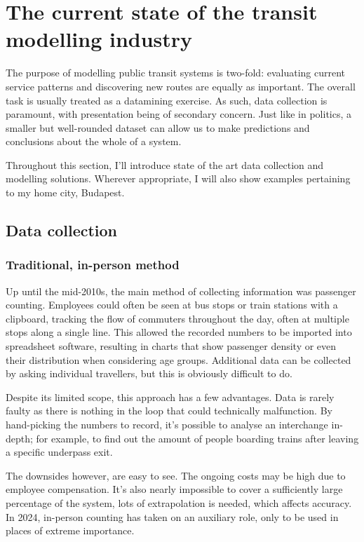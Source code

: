 \chapter{The current state of the transit modelling industry}
The purpose of modelling public transit systems is two-fold: evaluating current service patterns and discovering new routes are equally as important. The overall task is usually treated as a datamining exercise. As such, data collection is paramount, with presentation being of secondary concern. Just like in politics, a smaller but well-rounded dataset can allow us to make predictions and conclusions about the whole of a system.

Throughout this section, I'll introduce state of the art data collection and modelling solutions. Wherever appropriate, I will also show examples pertaining to my home city, Budapest.

\section{Data collection}
\subsection{Traditional, in-person method}

Up until the mid-2010s, the main method of collecting information was passenger counting. Employees could often be seen at bus stops or train stations with a clipboard, tracking the flow of commuters throughout the day, often at multiple stops along a single line. This allowed the recorded numbers to be imported into spreadsheet software, resulting in charts that show passenger density or even their distribution when considering age groups.
Additional data can be collected by asking individual travellers, but this is obviously difficult to do.

Despite its limited scope, this approach has a few advantages. Data is rarely faulty as there is nothing in the loop that could technically malfunction. By hand-picking the numbers to record, it's possible to analyse an interchange in-depth; for example, to find out the amount of people boarding trains after leaving a specific underpass exit.

The downsides however, are easy to see. The ongoing costs may be high due to employee compensation. It's also nearly impossible to cover a sufficiently large percentage of the system, lots of extrapolation is needed, which affects accuracy. In 2024, in-person counting has taken on an auxiliary role, only to be used in places of extreme importance.

